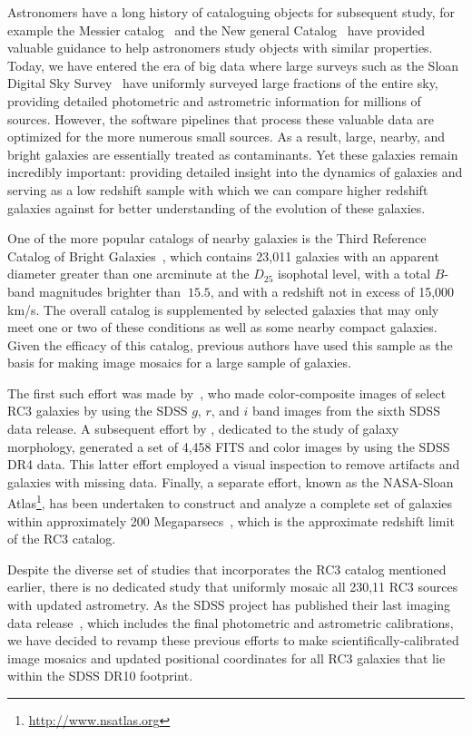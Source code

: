 \documentclass[authoryear, 12pt, 5p, times]{elsarticle}
\begin{document}
Astronomers have a long history of cataloguing objects for subsequent study, for example the Messier catalog~\citep{messcat} and the New general Catalog~\citep[NGC;][]{ngccat} have provided valuable guidance to help astronomers study objects with similar properties. Today, we have entered the era of big data where large surveys such as the Sloan Digital Sky Survey~\citep[SDSS;][]{sdsstech} have uniformly surveyed large fractions of the entire sky, providing detailed photometric and astrometric information for millions of sources. However, the software pipelines that  process these valuable data are optimized for the more numerous small sources. As a result, large, nearby, and bright galaxies are essentially treated as contaminants. Yet these galaxies remain incredibly important: providing detailed insight into the dynamics of galaxies and serving as a low redshift sample with which we can compare higher redshift galaxies against for better understanding of the evolution of these galaxies. 

One of the more popular catalogs of nearby galaxies is the Third Reference Catalog of Bright Galaxies~\citep[RC3;][]{rc31991}, which contains 23,011 galaxies with an apparent diameter greater than one arcminute at the $D_{25}$ isophotal level, with a total $B$-band magnitudes brighter than $~15.5$, and with a redshift not in excess of 15,000 km/s. The overall catalog is supplemented by selected galaxies that may only meet one or two of these conditions as well as some  nearby compact galaxies. Given the efficacy of this catalog, previous authors have used this sample as the basis for making image mosaics for a large sample of galaxies. 

The first such effort was made by~\cite{hbrc3}, who made color-composite images of select RC3 galaxies by using the SDSS $g$, $r$, and $i$ band images from the sixth SDSS data release. A subsequent effort by \citet{efigi}, dedicated to the study of galaxy morphology, generated a set of 4,458 FITS and color images by using the SDSS DR4 data. This latter effort employed a visual inspection to remove artifacts and galaxies with missing data. Finally, a separate effort, known as the NASA-Sloan Atlas\footnote{\url{http://www.nsatlas.org}}, has been undertaken to construct and analyze a complete set of galaxies within approximately 200 Megaparsecs~\citep{nsa}, which is the approximate redshift limit of the RC3 catalog.

Despite the diverse set of studies that incorporates the RC3 catalog mentioned earlier, there is no dedicated study that uniformly mosaic all 230,11 RC3 sources with updated astrometry. As the SDSS project has published their last imaging data release~\citep[DR10; ][]{dr10}, which includes the final photometric and astrometric calibrations, we have decided to revamp these previous efforts to make scientifically-calibrated image mosaics and updated positional coordinates for all RC3 galaxies that lie within the SDSS DR10 footprint. 
\end{document}
